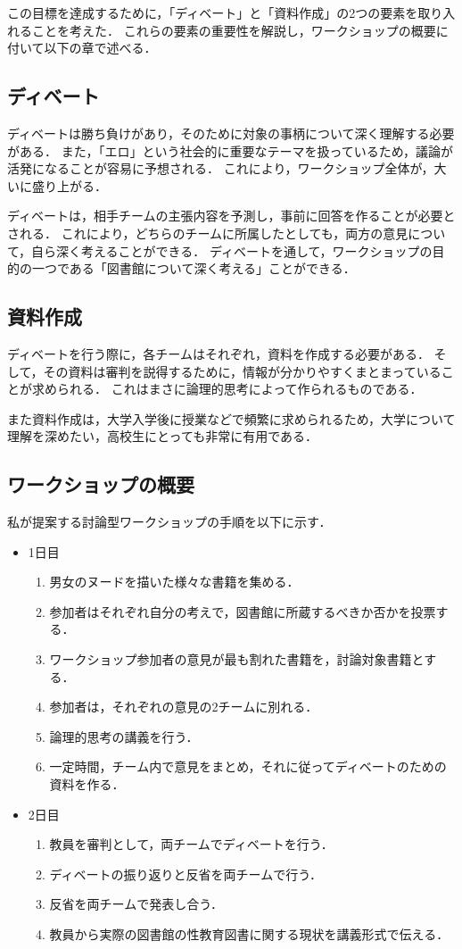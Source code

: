 \documentclass[pdflatex,ja=standard]{bxjsarticle}
\begin{document}
この目標を達成するために，「ディベート」と「資料作成」の2つの要素を取り入れることを考えた．
これらの要素の重要性を解説し，ワークショップの概要に付いて以下の章で述べる．

\subsection{ディベート}
ディベートは勝ち負けがあり，そのために対象の事柄について深く理解する必要がある．
また，「エロ」という社会的に重要なテーマを扱っているため，議論が活発になることが容易に予想される．
これにより，ワークショップ全体が，大いに盛り上がる．

ディベートは，相手チームの主張内容を予測し，事前に回答を作ることが必要とされる．
これにより，どちらのチームに所属したとしても，両方の意見について，自ら深く考えることができる．
ディベートを通して，ワークショップの目的の一つである「図書館について深く考える」ことができる．

\subsection{資料作成}
ディベートを行う際に，各チームはそれぞれ，資料を作成する必要がある．
そして，その資料は審判を説得するために，情報が分かりやすくまとまっていることが求められる．
これはまさに論理的思考によって作られるものである．

また資料作成は，大学入学後に授業などで頻繁に求められるため，大学について理解を深めたい，高校生にとっても非常に有用である．

\subsection{ワークショップの概要}
私が提案する討論型ワークショップの手順を以下に示す．
\begin{itemize}
    \item 1日目
    \begin{enumerate}
        \item 男女のヌードを描いた様々な書籍を集める．
        \item 参加者はそれぞれ自分の考えで，図書館に所蔵するべきか否かを投票する．
        \item ワークショップ参加者の意見が最も割れた書籍を，討論対象書籍とする．
        \item 参加者は，それぞれの意見の2チームに別れる．
        \item 論理的思考の講義を行う．
        \item 一定時間，チーム内で意見をまとめ，それに従ってディベートのための資料を作る．
    \end{enumerate}
    \item 2日目
    \begin{enumerate}
        \item 教員を審判として，両チームでディベートを行う．
        \item ディベートの振り返りと反省を両チームで行う．
        \item 反省を両チームで発表し合う．
        \item 教員から実際の図書館の性教育図書に関する現状を講義形式で伝える．
    \end{enumerate}
\end{itemize}
\end{document}
